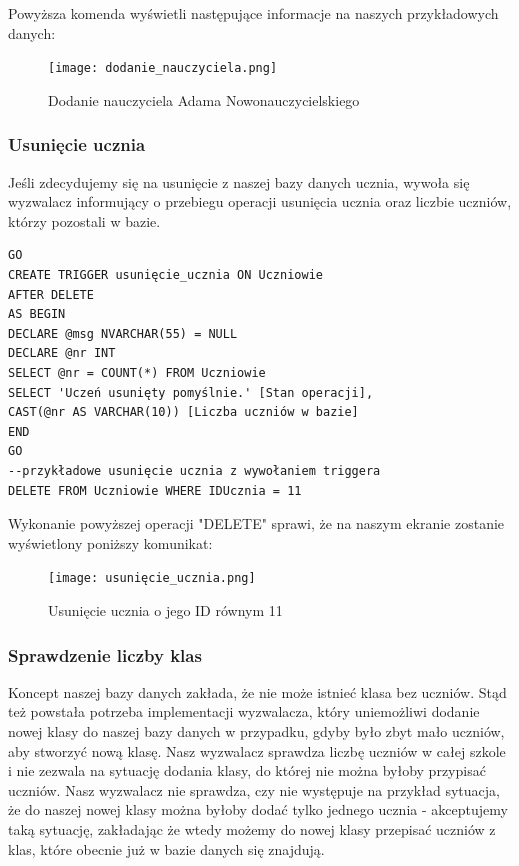 \documentclass[60pt]{article}
\begin{document}
Powyższa komenda wyświetli następujące informacje na naszych przykładowych danych:

\begin{figure}[h]
\begin{center}
  \texttt{[image: dodanie\_nauczyciela.png]}
  \caption{Dodanie nauczyciela Adama Nowonauczycielskiego}
  \label{Dodanie nauczyciela Adama Nowonauczycielskiego}
\end{center}
\end{figure}

\subsubsection{Usunięcie ucznia}

Jeśli zdecydujemy się na usunięcie z naszej bazy danych ucznia, wywoła się wyzwalacz informujący o przebiegu operacji usunięcia ucznia oraz liczbie uczniów, którzy pozostali w bazie. 

\begin{verbatim}
GO
CREATE TRIGGER usunięcie_ucznia ON Uczniowie
AFTER DELETE
AS BEGIN
DECLARE @msg NVARCHAR(55) = NULL
DECLARE @nr INT
SELECT @nr = COUNT(*) FROM Uczniowie
SELECT 'Uczeń usunięty pomyślnie.' [Stan operacji], 
CAST(@nr AS VARCHAR(10)) [Liczba uczniów w bazie]
END
GO
--przykładowe usunięcie ucznia z wywołaniem triggera
DELETE FROM Uczniowie WHERE IDUcznia = 11
\end{verbatim}

Wykonanie powyższej operacji "DELETE" sprawi, że na naszym ekranie zostanie wyświetlony poniższy komunikat:

\begin{figure}[h]
\begin{center}
  \texttt{[image: usunięcie\_ucznia.png]}
  \caption{Usunięcie ucznia o jego ID równym 11}
  \label{Usunięcie ucznia o jego ID równym 11}
\end{center}
\end{figure}

\subsubsection{Sprawdzenie liczby klas}

Koncept naszej bazy danych zakłada, że nie może istnieć klasa bez uczniów. Stąd też powstała potrzeba implementacji wyzwalacza, który uniemożliwi dodanie nowej klasy do naszej bazy danych w przypadku, gdyby było zbyt mało uczniów, aby stworzyć nową klasę. Nasz wyzwalacz sprawdza liczbę uczniów w całej szkole i nie zezwala na sytuację dodania klasy, do której nie można byłoby przypisać uczniów. Nasz wyzwalacz nie sprawdza, czy nie występuje na przykład sytuacja, że do naszej nowej klasy można byłoby dodać tylko jednego ucznia - akceptujemy taką sytuację, zakładając że wtedy możemy do nowej klasy przepisać uczniów z klas, które obecnie już w bazie danych się znajdują. 
\end{document}
